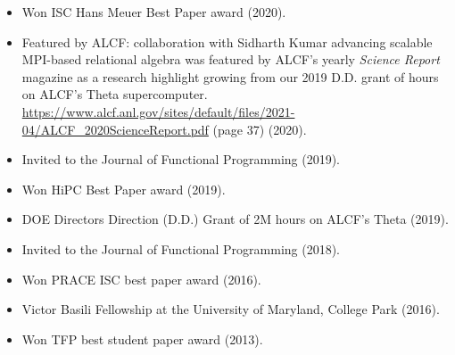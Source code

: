 \begin{itemize}
\item Won ISC Hans Meuer Best Paper award (2020).
\item Featured by ALCF: collaboration with Sidharth Kumar advancing scalable MPI-based relational algebra was featured by ALCF's yearly \emph{Science Report} magazine as a research highlight growing from our 2019 D.D. grant of hours on ALCF's Theta supercomputer. \url{https://www.alcf.anl.gov/sites/default/files/2021-04/ALCF_2020ScienceReport.pdf} (page 37) (2020).
\item Invited to the Journal of Functional Programming (2019).
\item Won HiPC Best Paper award (2019).
\item DOE Directors Direction (D.D.) Grant of 2M hours on ALCF's Theta (2019).
\item Invited to the Journal of Functional Programming (2018).
\item Won PRACE ISC best paper award (2016).
\item Victor Basili Fellowship at the University of Maryland, College Park (2016).
\item Won TFP best student paper award (2013).
\end{itemize}
